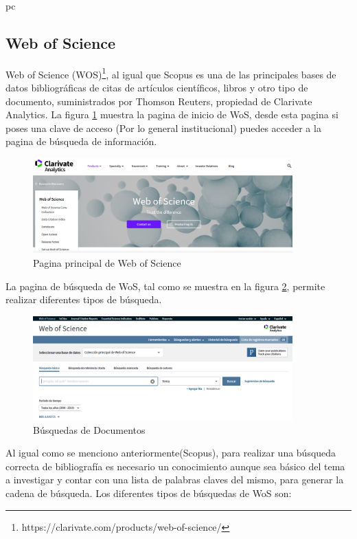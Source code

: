 pc\documentclass[a4paper,12pt,openany]{book}
\begin{document}
\begin{itemize}
\clearpage
\subsection{Web of Science}

Web of Science (WOS)\footnote{https://clarivate.com/products/web-of-science/}, al igual que Scopus es una de las principales bases de datos bibliográficas de citas de artículos científicos, libros y otro tipo de documento, suministrados por Thomson Reuters, propiedad de Clarivate Analytics. La figura \ref{fig:WOS1} muestra la pagina de inicio de WoS, desde esta pagina si poses una clave de acceso (Por lo general institucional) puedes acceder a la pagina de búsqueda de información.

        \begin{figure}[H]
        \centering
    	\includegraphics[width=10cm]{Wos1.png}
        \caption{Pagina principal de Web of Science}
        \label{fig:WOS1}
        \end{figure}

La pagina de búsqueda de WoS, tal como se muestra en la figura \ref{fig:WOS2}, permite realizar diferentes tipos de búsqueda. 

        \begin{figure}[H]
        \centering
    	\includegraphics[width=10cm]{Wos2.png}
        \caption{Búsquedas de Documentos}
        \label{fig:WOS2}
        \end{figure}

Al igual como se menciono anteriormente(Scopus), para realizar una búsqueda correcta de bibliografía es necesario un conocimiento aunque sea básico del tema a investigar y contar con una lista de palabras claves del mismo, para generar la cadena de búsqueda. 
Los diferentes tipos de búsquedas de WoS son:


\end{itemize}
\end{document}
